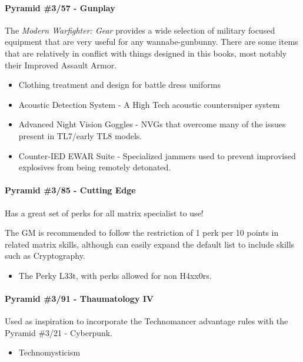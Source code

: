 \begin{multicols*}{3}
	\paragraph{\GURPS Pyramid \#3/57 - Gunplay}\label{pyramid_357}
	The \textit{Modern Warfighter: Gear} provides a wide selection of military focused equipment that are very useful for any wannabe-gunbunny. There are some items that are relatively in conflict with things designed in this books, most notably their Improved Assault Armor.
	\begin{itemize}
		\itemsep 0pt
		\item Clothing treatment and design for battle dress uniforms
		\item Acoustic Detection System - A High Tech acoustic countersniper system
		\item Advanced Night Vision Goggles - NVGs that overcome many of the issues present in TL7/early TL8 models.
		\item Counter-IED EWAR Suite - Specialized jammers used to prevent improvised explosives from being remotely detonated.
	\end{itemize}
	
	\paragraph{\GURPS Pyramid \#3/85 - Cutting Edge}
	Has a great set of perks for all matrix specialist to use! 
	
	The GM is recommended to follow the restriction of 1 perk per 10 points in related matrix skills, although can easily expand the default list to include skills such as Cryptography.
	
	\begin{itemize}
		\itemsep0em 
		\item The Perky L33t, with perks allowed for non H4xx0rs.
	\end{itemize}

	\paragraph{\GURPS Pyramid \#3/91 - Thaumatology IV}
	Used as inspiration to incorporate the Technomancer advantage rules with the Pyramid \#3/21 - Cyberpunk.
	
	\begin{itemize}
		\itemsep 0pt
		\item Technomysticism
	\end{itemize}



\end{multicols*}
